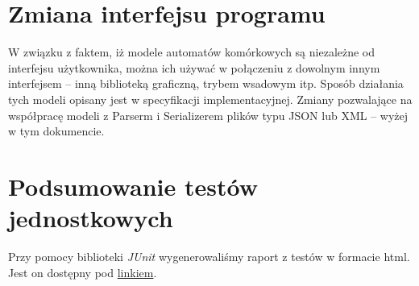 \documentclass{mwart}
\begin{document}
\section{Zmiana interfejsu programu}
W związku z faktem, iż modele automatów komórkowych są niezależne od interfejsu użytkownika, można ich używać w połączeniu z dowolnym innym interfejsem -- inną biblioteką graficzną, trybem wsadowym itp. Sposób działania tych modeli opisany jest w specyfikacji implementacyjnej. Zmiany pozwalające na współpracę modeli z Parserm i Serializerem plików typu JSON lub XML -- wyżej w tym dokumencie.

\section{Podsumowanie testów jednostkowych}
Przy pomocy biblioteki \textit{JUnit} wygenerowaliśmy raport z testów w formacie html.
Jest on dostępny pod \href{https://boguszj.github.io/Wire-world}{\textcolor{LinkColor}{linkiem}}.
\end{document}
